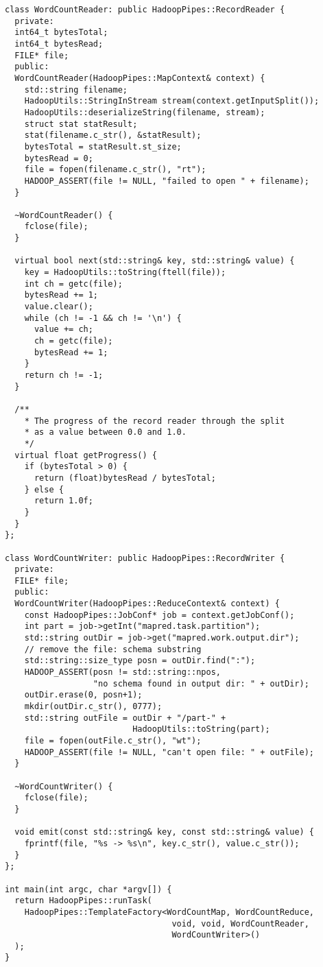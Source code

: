 \documentclass[a4paper, 12pt]{article}
\begin{document}
\begin{appendices}
\begin{lstlisting}[style=cpp]
class WordCountReader: public HadoopPipes::RecordReader {
  private:
  int64_t bytesTotal;
  int64_t bytesRead;
  FILE* file;
  public:
  WordCountReader(HadoopPipes::MapContext& context) {
    std::string filename;
    HadoopUtils::StringInStream stream(context.getInputSplit());
    HadoopUtils::deserializeString(filename, stream);
    struct stat statResult;
    stat(filename.c_str(), &statResult);
    bytesTotal = statResult.st_size;
    bytesRead = 0;
    file = fopen(filename.c_str(), "rt");
    HADOOP_ASSERT(file != NULL, "failed to open " + filename);
  }

  ~WordCountReader() {
    fclose(file);
  }

  virtual bool next(std::string& key, std::string& value) {
    key = HadoopUtils::toString(ftell(file));
    int ch = getc(file);
    bytesRead += 1;
    value.clear();
    while (ch != -1 && ch != '\n') {
      value += ch;
      ch = getc(file);
      bytesRead += 1;
    }
    return ch != -1;
  }

  /**
    * The progress of the record reader through the split
    * as a value between 0.0 and 1.0.
    */
  virtual float getProgress() {
    if (bytesTotal > 0) {
      return (float)bytesRead / bytesTotal;
    } else {
      return 1.0f;
    }
  }
};

class WordCountWriter: public HadoopPipes::RecordWriter {
  private:
  FILE* file;
  public:
  WordCountWriter(HadoopPipes::ReduceContext& context) {
    const HadoopPipes::JobConf* job = context.getJobConf();
    int part = job->getInt("mapred.task.partition");
    std::string outDir = job->get("mapred.work.output.dir");
    // remove the file: schema substring
    std::string::size_type posn = outDir.find(":");
    HADOOP_ASSERT(posn != std::string::npos, 
                  "no schema found in output dir: " + outDir);
    outDir.erase(0, posn+1);
    mkdir(outDir.c_str(), 0777);
    std::string outFile = outDir + "/part-" +
                          HadoopUtils::toString(part);
    file = fopen(outFile.c_str(), "wt");
    HADOOP_ASSERT(file != NULL, "can't open file: " + outFile);
  }

  ~WordCountWriter() {
    fclose(file);
  }

  void emit(const std::string& key, const std::string& value) {
    fprintf(file, "%s -> %s\n", key.c_str(), value.c_str());
  }
};

int main(int argc, char *argv[]) {
  return HadoopPipes::runTask(
    HadoopPipes::TemplateFactory<WordCountMap, WordCountReduce,
                                  void, void, WordCountReader,
                                  WordCountWriter>()
  );
}
\end{lstlisting}
\end{appendices}

\newpage
{}
\printbibliography
\end{document}
